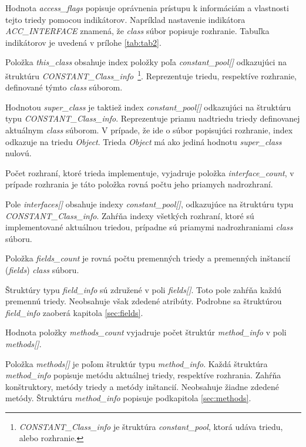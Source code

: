 \documentclass[11pt,final,oneside]{fithesis}
\begin{document}
Hodnota \textit{access\_flags} popisuje oprávnenia prístupu k
informáciám a vlastnosti tejto triedy pomocou
indikátorov. Napríklad nastavenie indikátora \textit{ACC\_INTERFACE} znamená,
že \textit{class} súbor popisuje rozhranie. Tabuľka indikátorov je uvedená v
prílohe \ref{tab:tab2}.

Položka \textit{this\_class} obsahuje index položky poľa 
\textit{constant\_pool[]} odkazujúci na štruktúru
\textit{CONSTANT\_Class\_info}~\footnote{\textit{CONSTANT\_Class\_info} je 
štruktúra \textit{constant\_pool}, ktorá
udáva triedu, alebo rozhranie.}. Reprezentuje triedu, respektíve
rozhranie, definované týmto \textit{class} súborom.

Hodnotou \textit{super\_class} je taktiež index \textit{constant\_pool[]}
odkazujúci na štruktúru typu \textit{CONSTANT\_Class\_info}. Reprezentuje
priamu nadtriedu triedy definovanej aktuálnym \textit{class} súborom. V 
prípade, že ide o súbor popisujúci rozhranie, index odkazuje na triedu
\textit{Object}. Trieda \textit{Object} má ako jediná hodnotu
\textit{super\_class} nulovú.

Počet rozhraní, ktoré trieda implementuje, vyjadruje položka
\textit{interface\_count}, v prípade rozhrania je táto položka rovná počtu
jeho priamych nadrozhraní.

Pole \textit{interfaces[]} obsahuje indexy \textit{constant\_pool[]},
odkazujúce na štruktúru typu \textit{CONSTANT\_Class\_info}. Zahŕňa indexy
všetkých rozhraní, ktoré sú implementované aktuálnou triedou, prípadne sú 
priamymi nadrozhraniami \textit{class} súboru.

Položka \textit{fields\_count} je rovná počtu premenných triedy a premenných
inštancií (\textit{fields}) \textit{class} súboru.

Štruktúry typu \textit{field\_info} sú združené v poli \textit{fields[]}. Toto
pole zahŕňa každú premennú triedy. Neobsahuje však zdedené atribúty. Podrobne 
sa štruktúrou \textit{field\_info} zaoberá kapitola \ref{sec:fields}.

Hodnota položky \textit{methods\_count} vyjadruje počet štruktúr
\textit{method\_info} v poli \textit{methods[]}.

Položka \textit{methods[]} je poľom štruktúr typu \textit{method\_info}. Každá
štruktúra \textit{method\_info} popisuje metódu aktuálnej triedy, respektíve
rozhrania. Zahŕňa konštruktory, metódy triedy a
metódy inštancií. Neobsahuje žiadne zdedené metódy. Štruktúru
\textit{method\_info} popisuje podkapitola \ref{sec:methods}.
\end{document}
